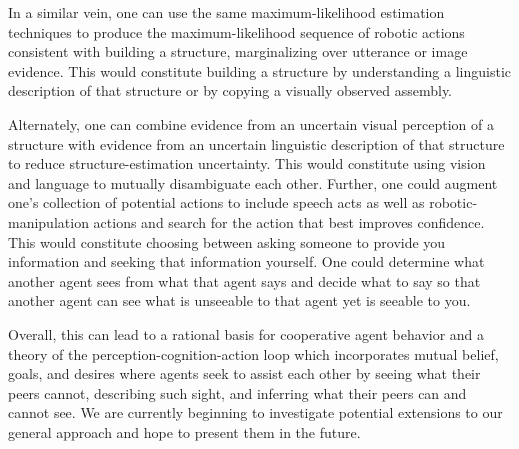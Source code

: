 In a similar vein, one can use the same maximum-likelihood estimation
techniques to produce the maximum-likelihood sequence of robotic actions
consistent with building a structure, marginalizing over utterance or image
evidence.
%
This would constitute building a structure by understanding a linguistic
description of that structure or by copying a visually observed assembly.

Alternately, one can combine evidence from an uncertain visual perception of a
structure with evidence from an uncertain linguistic description of that
structure to reduce structure-estimation uncertainty.
%
This would constitute using vision and language to mutually disambiguate each
other.
%
Further, one could augment one's collection of potential actions to include
speech acts as well as robotic-manipulation actions and search for the action
that best improves confidence.
%
This would constitute choosing between asking someone to provide you information
and seeking that information yourself.
%
One could determine what another agent sees from what that agent says and
decide what to say so that another agent can see what is unseeable to that
agent yet is seeable to you.

Overall, this can lead to a rational basis for cooperative agent behavior and a
theory of the perception-cognition-action loop which incorporates mutual
belief, goals, and desires where agents seek to assist each other by seeing
what their peers cannot, describing such sight, and inferring what their peers
can and cannot see.
%
We are currently beginning to investigate potential extensions to our
general approach and hope to present them in the future.

